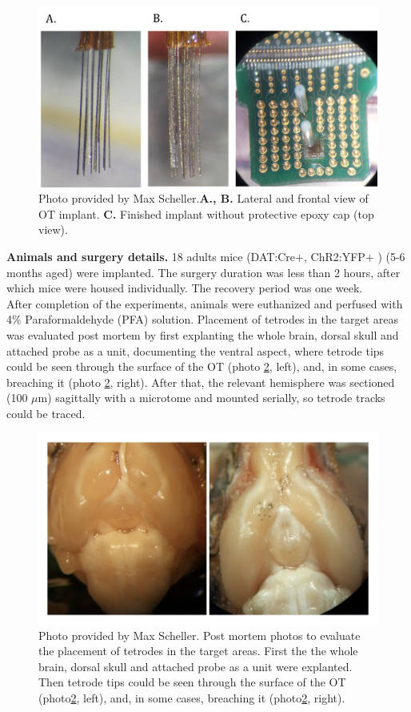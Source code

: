 \begin{figure}[H]
    \centering
    \includegraphics[scale=0.4]{figures/Implant.png}
    \caption{Photo provided by Max Scheller.\textbf{A., B.} Lateral and frontal view of OT implant. \textbf{C.} Finished implant without protective epoxy cap (top view).}
    \label{fig:implant}
\end{figure}
\textbf{Animals and surgery details.}
18 adults mice (DAT:Cre$+$, ChR2:YFP$+$ ) (5-6 months aged) were implanted. The surgery duration was less than 2 hours, after which mice were housed individually. The recovery period was one week.\\ After completion of the experiments, animals were euthanized and perfused with 4$\%$ Paraformaldehyde (PFA) solution. Placement of tetrodes in the target areas was evaluated post mortem by first explanting the whole brain, dorsal skull and attached probe as a unit, documenting the ventral aspect, where tetrode tips could be seen through the surface of the OT (photo \ref{fig:surgery}, left), and, in some cases, breaching it (photo \ref{fig:surgery}, right). After that, the relevant hemisphere was sectioned (100 $\mu$m) sagittally with a microtome and mounted serially, so tetrode tracks could be traced.\\
\begin{figure}[H]
    \centering
    \includegraphics[scale=0.2]{figures/surgery_3.jpg}
    \caption{Photo provided by Max Scheller. Post mortem photos to evaluate the placement of tetrodes in the target areas. First the the whole brain, dorsal skull and attached probe as a unit were explanted. Then tetrode tips could be seen through the surface of the OT (photo\ref{fig:surgery}, left), and, in some cases, breaching it (photo\ref{fig:surgery}, right).}
    \label{fig:surgery}
\end{figure}
